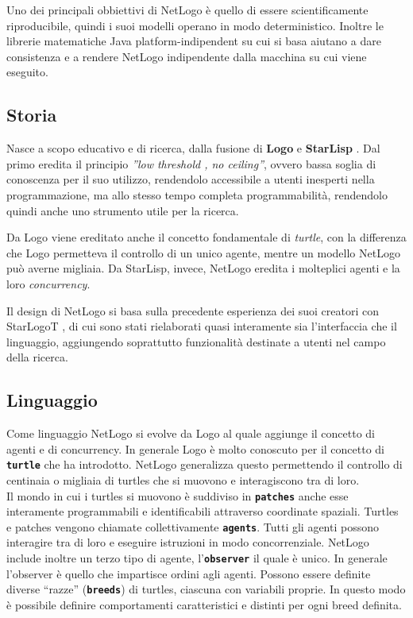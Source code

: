Uno dei principali obbiettivi di NetLogo è quello di essere scientificamente riproducibile, quindi i suoi modelli operano in modo deterministico. Inoltre le librerie matematiche Java platform-indipendent su cui si basa aiutano a dare consistenza e a rendere NetLogo indipendente dalla macchina su cui viene eseguito.

\subsection{Storia}

Nasce a scopo educativo e di ricerca, dalla fusione di \textbf{Logo} \cite{logo} e \textbf{StarLisp} \cite{starlisp}. Dal primo eredita il principio \textit{”low threshold , no ceiling”}, ovvero bassa soglia di conoscenza per il suo utilizzo, rendendolo accessibile a utenti inesperti nella programmazione, ma allo stesso tempo completa programmabilità, rendendolo quindi anche uno strumento utile per la ricerca.

Da Logo viene ereditato anche il concetto fondamentale di \textit{turtle}, con la differenza che Logo permetteva il controllo di un unico agente, mentre un modello NetLogo può averne migliaia. Da StarLisp, invece, NetLogo eredita i molteplici agenti e la loro \textit{concurrency}.

Il design di NetLogo si basa sulla precedente esperienza dei suoi creatori con StarLogoT \cite{starlogot}, di cui sono stati rielaborati quasi interamente sia l'interfaccia che il linguaggio, aggiungendo soprattutto funzionalità destinate a utenti nel campo della ricerca.

\subsection{Linguaggio}
Come linguaggio NetLogo si evolve da Logo al quale aggiunge il concetto di agenti e di concurrency. In generale Logo è molto conoscuto per il concetto di \textbf{\texttt{turtle}} che ha introdotto. NetLogo generalizza questo permettendo il controllo di centinaia o migliaia di turtles che si muovono e interagiscono tra di loro.\\
Il mondo in cui i turtles si muovono è suddiviso in \textbf{\texttt{patches}} anche esse interamente programmabili e identificabili attraverso coordinate spaziali. Turtles e patches vengono chiamate collettivamente \textbf{\texttt{agents}}. Tutti gli agenti possono interagire tra di loro e eseguire istruzioni in modo concorrenziale. NetLogo include inoltre un terzo tipo di agente, l'\textbf{\texttt{observer}} il quale è unico. In generale l'observer è quello che impartisce ordini agli agenti. Possono essere definite diverse “razze” (\textbf{\texttt{breeds}}) di turtles, ciascuna con variabili proprie. In questo modo è possibile definire comportamenti caratteristici e distinti per ogni breed definita. 


